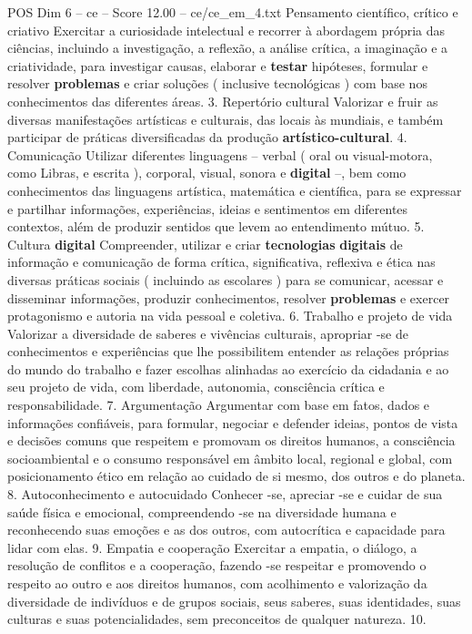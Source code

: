 \begin{textsample}{POS Dim 6 – ce – Score 12.00 – ce/ce\_em\_4.txt}
Pensamento científico, crítico e criativo Exercitar a curiosidade intelectual e recorrer à abordagem própria das ciências, incluindo a investigação, a reflexão, a análise crítica, a imaginação e a criatividade, para investigar causas, elaborar e \textbf{testar} hipóteses, formular e resolver \textbf{problemas} e criar soluções ( inclusive tecnológicas ) com base nos conhecimentos das diferentes áreas. 3.
Repertório cultural Valorizar e fruir as diversas manifestações artísticas e culturais, das locais às mundiais, e também participar de práticas diversificadas da produção \textbf{artístico-cultural}. 4.
Comunicação Utilizar diferentes linguagens – verbal ( oral ou visual-motora, como Libras, e escrita ), corporal, visual, sonora e \textbf{digital} –, bem como conhecimentos das linguagens artística, matemática e científica, para se expressar e partilhar informações, experiências, ideias e sentimentos em diferentes contextos, além de produzir sentidos que levem ao entendimento mútuo. 5.
Cultura \textbf{digital} Compreender, utilizar e criar \textbf{tecnologias} \textbf{digitais} de informação e comunicação de forma crítica, significativa, reflexiva e ética nas diversas práticas sociais ( incluindo as escolares ) para se comunicar, acessar e disseminar informações, produzir conhecimentos, resolver \textbf{problemas} e exercer protagonismo e autoria na vida pessoal e coletiva. 6.
Trabalho e projeto de vida Valorizar a diversidade de saberes e vivências culturais, apropriar -se de conhecimentos e experiências que lhe possibilitem entender as relações próprias do mundo do trabalho e fazer escolhas alinhadas ao exercício da cidadania e ao seu projeto de vida, com liberdade, autonomia, consciência crítica e responsabilidade. 7.
Argumentação Argumentar com base em fatos, dados e informações confiáveis, para formular, negociar e defender ideias, pontos de vista e decisões comuns que respeitem e promovam os direitos humanos, a consciência socioambiental e o consumo responsável em âmbito local, regional e global, com posicionamento ético em relação ao cuidado de si mesmo, dos outros e do planeta. 8.
Autoconhecimento e autocuidado Conhecer -se, apreciar -se e cuidar de sua saúde física e emocional, compreendendo -se na diversidade humana e reconhecendo suas emoções e as dos outros, com autocrítica e capacidade para lidar com elas. 9.
Empatia e cooperação Exercitar a empatia, o diálogo, a resolução de conflitos e a cooperação, fazendo -se respeitar e promovendo o respeito ao outro e aos direitos humanos, com acolhimento e valorização da diversidade de indivíduos e de grupos sociais, seus saberes, suas identidades, suas culturas e suas potencialidades, sem preconceitos de qualquer natureza. 10.

\end{textsample}
